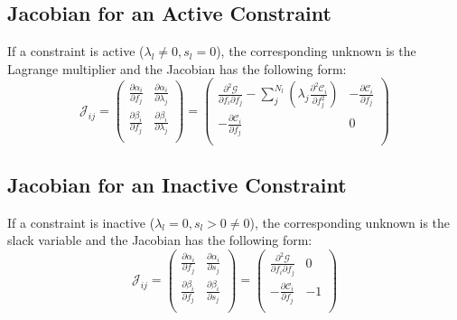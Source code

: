\documentclass{article}
\begin{document}
\subsection{Jacobian for an Active Constraint}
\label{sec:jacobianActive}

\noindent If a constraint is active ($\lambda_l \ne 0, s_l = 0$), the
corresponding unknown is the Lagrange multiplier and the Jacobian has the
following form:
\begin{equation}
\label{eq:21}
    \mathcal{J}_{ij}
  =
    \begin{pmatrix}
        \frac{\partial \alpha_i}{\partial f_j}
      & \frac{\partial \alpha_i}{\partial \lambda_j} \\
        \frac{\partial \beta_i}{\partial f_j}
      & \frac{\partial \beta_i}{\partial \lambda_j} \\
    \end{pmatrix}
  =
    \begin{pmatrix}
        \frac{\partial^2 \mathcal{G}}{\partial f_i \partial f_j}
      - \sum_j^{N_l} \left( \lambda_j \frac{\partial^2 \mathcal{C}_i}{\partial f_j^2} \right)
      & -\frac{\partial \mathcal{C}_i}{\partial f_j} \\
        -\frac{\partial \mathcal{C}_i}{\partial f_j}
      & 0 \\
    \end{pmatrix}
\end{equation}

\subsection{Jacobian for an Inactive Constraint}
\label{sec:jacobianInactive}

\noindent If a constraint is inactive ($\lambda_l = 0, s_l > 0 \ne 0$), the
corresponding unknown is the slack variable and the Jacobian has the following
form:
\begin{equation}
\label{eq:22}
    \mathcal{J}_{ij}
  =
    \begin{pmatrix}
        \frac{\partial \alpha_i}{\partial f_j}
      & \frac{\partial \alpha_i}{\partial s_j} \\
        \frac{\partial \beta_i}{\partial f_j}
      & \frac{\partial \beta_i}{\partial s_j} \\
    \end{pmatrix}
  =
    \begin{pmatrix}
        \frac{\partial^2 \mathcal{G}}{\partial f_i \partial f_j}
      & 0 \\
        -\frac{\partial \mathcal{C}_i}{\partial f_j}
      & -1 \\
    \end{pmatrix}
\end{equation}
\end{document}
